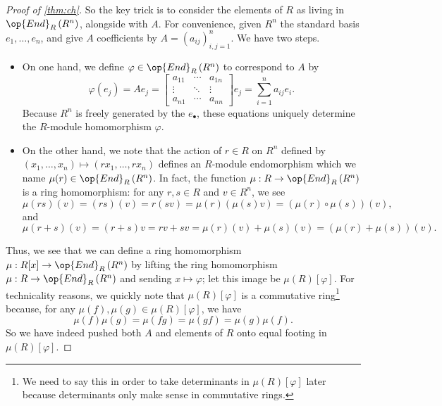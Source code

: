 \begin{proof}[Proof of \autoref{thm:ch}]
	So the key trick is to consider the elements of $R$ as living in $\op{End}_R\left(R^n\right)$, alongside with $A$. For convenience, given $R^n$ the standard basis $e_1,\ldots,e_n$, and give $A$ coefficients by $A=(a_{ij})_{i,j=1}^n$. We have two steps.
	\begin{itemize}
		\item On one hand, we define $\varphi\in\op{End}_R\left(R^n\right)$ to correspond to $A$ by
		\[\varphi(e_j)=Ae_j=\begin{bmatrix}
			a_{11} & \cdots & a_{1n} \\
			\vdots & \ddots & \vdots \\
			a_{n1} & \cdots & a_{nn}
		\end{bmatrix}e_j=\sum_{i=1}^na_{ij}e_i.\]
		Because $R^n$ is freely generated by the $e_\bullet$, these equations uniquely determine the $R$-module homomorphism $\varphi$.
		\item On the other hand, we note that the action of $r\in R$ on $R^n$ defined by $(x_1,\ldots,x_n)\mapsto(rx_1,\ldots,rx_n)$ defines an $R$-module endomorphism which we name $\mu(r)\in\op{End}_R\left(R^n\right)$. In fact, the function $\mu:R\to\op{End}_R\left(R^n\right)$ is a ring homomorphism: for any $r,s\in R$ and $v\in R^n$, we see
		\[\mu(rs)(v)=(rs)(v)=r(sv)=\mu(r)(\mu(s)v)=(\mu(r)\circ\mu(s))(v),\]
		and
		\[\mu(r+s)(v)=(r+s)v=rv+sv=\mu(r)(v)+\mu(s)(v)=(\mu(r)+\mu(s))(v).\]
	\end{itemize}
	Thus, we see that we can define a ring homomorphism $\mu:R[x]\to\op{End}_R\left(R^n\right)$ by lifting the ring homomorphism $\mu:R\to\op{End}_R\left(R^n\right)$ and sending $x\mapsto\varphi$; let this image be $\mu(R)[\varphi]$. For technicality reasons, we quickly note that $\mu(R)[\varphi]$ is a commutative ring\footnote{We need to say this in order to take determinants in $\mu(R)[\varphi]$ later because determinants only make sense in commutative rings.} because, for any $\mu(f),\mu(g)\in\mu(R)[\varphi]$, we have
	\[\mu(f)\mu(g)=\mu(fg)=\mu(gf)=\mu(g)\mu(f).\]
	So we have indeed pushed both $A$ and elements of $R$ onto equal footing in $\mu(R)[\varphi]$.


\end{proof}
